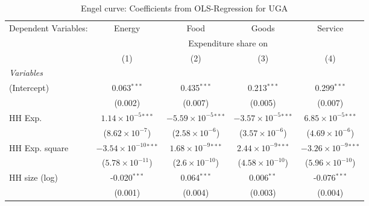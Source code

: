 
\begin{table}[htbp!]
   \centering
   \small
   \begin{adjustbox}{width = 1\textwidth, max height = 0.95\textheight, center}
      \begin{threeparttable}[b]
         \caption{\label{tab:Engel_parametric_UGA} Engel curve: Coefficients from OLS-Regression for UGA}
         \begin{tabular}{lcccc}
            \tabularnewline \midrule \midrule
            Dependent Variables: & Energy                          & Food                           & Goods                          & Service\\  
             & \multicolumn{4}{c}{Expenditure share on} \\ 
                                 & (1)                             & (2)                            & (3)                            & (4)\\  
            \midrule
            \emph{Variables}\\
            (Intercept)          & 0.063$^{***}$                   & 0.435$^{***}$                  & 0.213$^{***}$                  & 0.299$^{***}$\\   
                                 & (0.002)                         & (0.007)                        & (0.005)                        & (0.007)\\   
            HH Exp.              & $1.14\times 10^{-5}$$^{***}$    & $-5.59\times 10^{-5}$$^{***}$  & $-3.57\times 10^{-5}$$^{***}$  & $6.85\times 10^{-5}$$^{***}$\\    
                                 & ($8.62\times 10^{-7}$)          & ($2.58\times 10^{-6}$)         & ($3.57\times 10^{-6}$)         & ($4.69\times 10^{-6}$)\\    
            HH Exp. square       & $-3.54\times 10^{-10}$$^{***}$  & $1.68\times 10^{-9}$$^{***}$   & $2.44\times 10^{-9}$$^{***}$   & $-3.26\times 10^{-9}$$^{***}$\\    
                                 & ($5.78\times 10^{-11}$)         & ($2.6\times 10^{-10}$)         & ($4.58\times 10^{-10}$)        & ($5.96\times 10^{-10}$)\\    
            HH size (log)        & -0.020$^{***}$                  & 0.064$^{***}$                  & 0.006$^{**}$                   & -0.076$^{***}$\\   
                                 & (0.001)                         & (0.004)                        & (0.003)                        & (0.004)\\   

\end{tabular}
\end{threeparttable}
\end{adjustbox}
\end{table}

